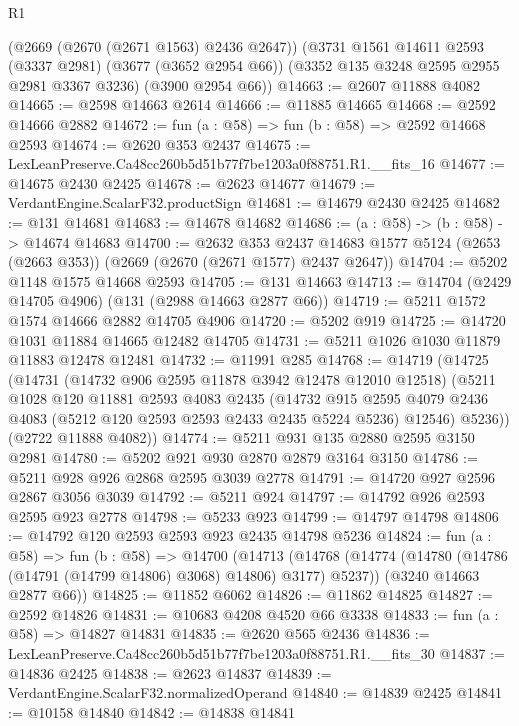 \begin{lexlean}{R1}
\begin{coremodule}
    (@2669 (@2670 (@2671 @1563) @2436 @2647))
    (@3731
      @1561
      @14611
      @2593
      (@3337 @2981)
      (@3677 (@3652 @2954 @66))
      (@3352 @135 @3248 @2595 @2955 @2981 @3367 @3236)
      (@3900 @2954 @66))
@14663 := @2607 @11888 @4082
@14665 := @2598 @14663 @2614
@14666 := @11885 @14665
@14668 := @2592 @14666 @2882
@14672 := fun (a : @58) => fun (b : @58) => @2592 @14668 @2593
@14674 := @2620 @353 @2437
@14675 := LexLeanPreserve.Ca48cc260b5d51b77f7be1203a0f88751.R1.__fits_16
@14677 := @14675 @2430 @2425
@14678 := @2623 @14677
@14679 := VerdantEngine.ScalarF32.productSign
@14681 := @14679 @2430 @2425
@14682 := @131 @14681
@14683 := @14678 @14682
@14686 := (a : @58) -> (b : @58) -> @14674 @14683
@14700 := @2632
    @353
    @2437
    @14683
    @1577
    @5124
    (@2653 (@2663 @353))
    (@2669 (@2670 (@2671 @1577) @2437 @2647))
@14704 := @5202 @1148 @1575 @14668 @2593
@14705 := @131 @14663
@14713 := @14704 (@2429 @14705 @4906) (@131 (@2988 @14663 @2877 @66))
@14719 := @5211 @1572 @1574 @14666 @2882 @14705 @4906
@14720 := @5202 @919
@14725 := @14720 @1031 @11884 @14665 @12482 @14705
@14731 := @5211 @1026 @1030 @11879 @11883 @12478 @12481
@14732 := @11991 @285
@14768 := @14719
    (@14725
      (@14731
        (@14732 @906 @2595 @11878 @3942 @12478 @12010 @12518)
        (@5211
          @1028
          @120
          @11881
          @2593
          @4083
          @2435
          (@14732
            @915
            @2595
            @4079
            @2436
            @4083
            (@5212 @120 @2593 @2593 @2433 @2435 @5224 @5236)
            @12546)
          @5236))
      (@2722 @11888 @4082))
@14774 := @5211 @931 @135 @2880 @2595 @3150 @2981
@14780 := @5202 @921 @930 @2870 @2879 @3164 @3150
@14786 := @5211 @928 @926 @2868 @2595 @3039 @2778
@14791 := @14720 @927 @2596 @2867 @3056 @3039
@14792 := @5211 @924
@14797 := @14792 @926 @2593 @2595 @923 @2778
@14798 := @5233 @923
@14799 := @14797 @14798
@14806 := @14792 @120 @2593 @2593 @923 @2435 @14798 @5236
@14824 := fun (a : @58) =>
  fun (b : @58) =>
  @14700
    (@14713
      (@14768 (@14774 (@14780 (@14786 (@14791 (@14799 @14806) @3068) @14806) @3177) @5237))
      (@3240 @14663 @2877 @66))
@14825 := @11852 @6062
@14826 := @11862 @14825
@14827 := @2592 @14826
@14831 := @10683 @4208 @4520 @66 @3338
@14833 := fun (a : @58) => @14827 @14831
@14835 := @2620 @565 @2436
@14836 := LexLeanPreserve.Ca48cc260b5d51b77f7be1203a0f88751.R1.__fits_30
@14837 := @14836 @2425
@14838 := @2623 @14837
@14839 := VerdantEngine.ScalarF32.normalizedOperand
@14840 := @14839 @2425
@14841 := @10158 @14840
@14842 := @14838 @14841

\end{coremodule}
\end{lexlean}
